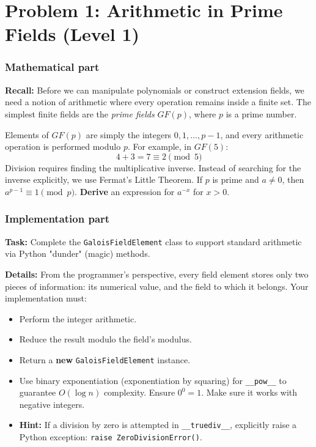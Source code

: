 \section*{Problem 1: Arithmetic in Prime Fields (Level 1)}

\subsubsection*{Mathematical part}
\textbf{Recall:} Before we can manipulate polynomials or construct extension fields, we need a notion of arithmetic where every operation remains inside a finite set. The simplest finite fields are the \emph{prime fields} $GF(p)$, where $p$ is a prime number.

Elements of $GF(p)$ are simply the integers $0, 1, \ldots, p-1$, and every arithmetic operation is performed modulo $p$. For example, in $GF(5)$:
\[
4+3 = 7 \equiv 2 \pmod 5
\]
Division requires finding the multiplicative inverse. Instead of searching for the inverse explicitly, we use Fermat's Little Theorem. If $p$ is prime and $a\neq0$, then $a^{p-1}\equiv1\pmod p$. \textbf{Derive} an expression for $a^{-x}$ for $x > 0$.

\subsubsection*{Implementation part}
\textbf{Task:} Complete the \lstinline|GaloisFieldElement| class to support standard arithmetic via Python "dunder" (magic) methods. 

\textbf{Details:} From the programmer's perspective, every field element stores only two pieces of information: its numerical value, and the field to which it belongs. Your implementation must:
\begin{itemize}
    \item Perform the integer arithmetic.
    \item Reduce the result modulo the field's modulus.
    \item Return a \textbf{new} \lstinline|GaloisFieldElement| instance.
    \item Use binary exponentiation (exponentiation by squaring) for \lstinline|__pow__| to guarantee $O(\log n)$ complexity. Ensure $0^0 = 1$. Make sure it works with negative integers. 
    \item \textbf{Hint:} If a division by zero is attempted in \lstinline|__truediv__|, explicitly raise a Python exception: \lstinline|raise ZeroDivisionError()|.
\end{itemize}

